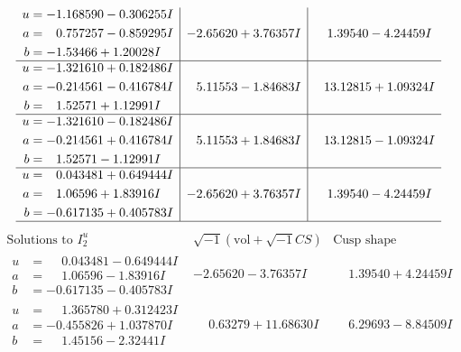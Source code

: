\documentclass[1p]{elsarticle_modified}
\theoremstyle{definition}
\newcommand{\I}{\sqrt{-1}}
\begin{document}
$$\begin{array}{c|c|c}
\begin{aligned}
u &= -1.168590 - 0.306255 I \\
a &= \phantom{-}0.757257 - 0.859295 I \\
b &= -1.53466 + 1.20028 I\end{aligned}
 & -2.65620 + 3.76357 I & \phantom{-}1.39540 - 4.24459 I \\ \hline\begin{aligned}
u &= -1.321610 + 0.182486 I \\
a &= -0.214561 - 0.416784 I \\
b &= \phantom{-}1.52571 + 1.12991 I\end{aligned}
 & \phantom{-}5.11553 - 1.84683 I & \phantom{-}13.12815 + 1.09324 I \\ \hline\begin{aligned}
u &= -1.321610 - 0.182486 I \\
a &= -0.214561 + 0.416784 I \\
b &= \phantom{-}1.52571 - 1.12991 I\end{aligned}
 & \phantom{-}5.11553 + 1.84683 I & \phantom{-}13.12815 - 1.09324 I \\ \hline\begin{aligned}
u &= \phantom{-}0.043481 + 0.649444 I \\
a &= \phantom{-}1.06596 + 1.83916 I \\
b &= -0.617135 + 0.405783 I\end{aligned}
 & -2.65620 + 3.76357 I & \phantom{-}1.39540 - 4.24459 I\\
 \hline 
 \end{array}$$\newpage$$\begin{array}{c|c|c}  
\text{Solutions to }I^u_{2}& \I (\text{vol} + \sqrt{-1}CS) & \text{Cusp shape}\\
 \hline 
\begin{aligned}
u &= \phantom{-}0.043481 - 0.649444 I \\
a &= \phantom{-}1.06596 - 1.83916 I \\
b &= -0.617135 - 0.405783 I\end{aligned}
 & -2.65620 - 3.76357 I & \phantom{-}1.39540 + 4.24459 I \\ \hline\begin{aligned}
u &= \phantom{-}1.365780 + 0.312423 I \\
a &= -0.455826 + 1.037870 I \\
b &= \phantom{-}1.45156 - 2.32441 I\end{aligned}
 & \phantom{-}0.63279 + 11.68630 I & \phantom{-}6.29693 - 8.84509 I \\ \hline\begin{aligned}

\end{aligned}
\end{array}$$
\end{document}

